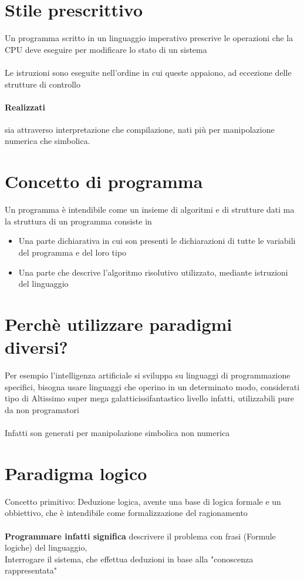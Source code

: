 \documentclass[12pt, a4paper, openany, oneside]{book}
\begin{document}
{\section{Stile prescrittivo}
Un programma scritto in un linguaggio imperativo prescrive le operazioni che
la CPU deve eseguire per modificare lo stato di un sistema \\ \\
Le istruzioni sono eseguite nell'ordine in cui queste appaiono, ad eccezione
delle strutture di controllo
\paragraph{Realizzati} sia attraverso interpretazione che compilazione, nati
più per manipolazione numerica che simbolica.
\\
\section{Concetto di programma}
Un programma è intendibile come un insieme di algoritmi e di strutture dati
ma la struttura di un programma consiste in
\begin{itemize}
	\item Una parte dichiarativa in cui son presenti le dichiarazioni di tutte
	le variabili del programma e del loro tipo
	\item Una parte che descrive l'algoritmo risolutivo utilizzato, mediante istruzioni del linguaggio	
\end{itemize}
\section{Perchè utilizzare paradigmi diversi?}
Per esempio l'intelligenza artificiale si sviluppa su linguaggi di 
programmazione specifici, bisogna usare linguaggi che operino in un 
determinato modo, considerati tipo di Altissimo super mega galatticissifantastico 
livello infatti, utilizzabili pure da non programatori
\\ \\
Infatti son generati per manipolazione simbolica non numerica 
\section{Paradigma logico}
Concetto primitivo: Deduzione logica, avente una base di logica formale e un 
obbiettivo, che è intendibile come formalizzazione del ragionamento
\\ \\
\textbf{Programmare infatti significa} descrivere il problema con frasi 
(Formule logiche) del linguaggio, \\
Interrogare il sistema, che effettua deduzioni in base alla "conoscenza 
rappresentata" 
}
\end{document}
